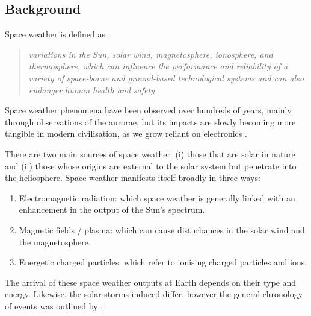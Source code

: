 \subsection{Background}
Space weather is defined as \citep{cannon_extreme_2013}:

\begin{quote}
	\textit{variations in the Sun, solar wind, magnetosphere, ionosphere, and thermosphere, which can influence the performance and reliability of a variety of space-borne and ground-based technological systems and can also endanger human health and safety.}
\end{quote}

Space weather phenomena have been observed over hundreds of years, mainly through observations of the aurorae, but its impacts are slowly becoming more tangible in modern civilisation, as we grow reliant on electronics \citep{beggan_ground_2018}.

There are two main sources of space weather: (i) those that are solar in nature and (ii) those whose origins are external to the solar system but penetrate into the heliosphere. Space weather manifests itself broadly in three ways:

\begin{enumerate}
	\item{Electromagnetic radiation: which space weather is generally linked with an enhancement in the output of the Sun's spectrum.}
	
	\item{Magnetic fields / plasma: which can cause disturbances in the solar wind and the magnetosphere.}
	
	\item{Energetic charged particles: which refer to ionising charged particles and ions.}
\end{enumerate}

The arrival of these space weather outputs at Earth depends on their type and energy. Likewise, the solar storms induced differ, however the general chronology of events was outlined by \citet{cannon_extreme_2013}:

